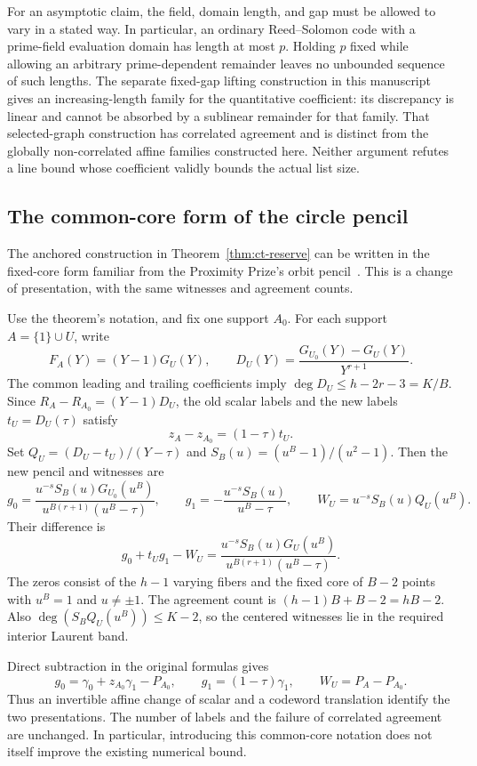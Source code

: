 \documentclass[11pt,letterpaper]{article}
\theoremstyle{definition}
\theoremstyle{remark}
\begin{document}
For an asymptotic claim, the field, domain length, and gap must be allowed
to vary in a stated way. In particular, an ordinary Reed--Solomon code
with a prime-field evaluation domain has length at most $p$. Holding
$p$ fixed while allowing an arbitrary prime-dependent remainder leaves
no unbounded sequence of such lengths. The separate fixed-gap lifting
construction in this manuscript gives an increasing-length family for
the quantitative coefficient: its discrepancy is linear and cannot be
absorbed by a sublinear remainder for that family. That selected-graph
construction has correlated agreement and is distinct from the globally
non-correlated affine families constructed here. Neither argument
refutes a line bound whose coefficient validly bounds the actual list
size.

\subsection{The common-core form of the circle pencil}
\label{app:common-core}

The anchored construction in Theorem~\ref{thm:ct-reserve} can be written
in the fixed-core form familiar from the Proximity Prize's orbit
pencil~\cite{orbit-pencil}. This is a change of presentation, with the
same witnesses and agreement counts.

Use the theorem's notation, and fix one support $A_0$. For each support
$A=\{1\}\cup U$, write
\[
 F_A(Y)=(Y-1)G_U(Y),\qquad
 D_U(Y)=\frac{G_{U_0}(Y)-G_U(Y)}{Y^{r+1}}.
\]
The common leading and trailing coefficients imply
$\deg D_U\le h-2r-3=K/B$. Since
$R_A-R_{A_0}=(Y-1)D_U$, the old scalar labels and the new labels
$t_U=D_U(\tau)$ satisfy
\[
 z_A-z_{A_0}=(1-\tau)t_U.
\]
Set $Q_U=(D_U-t_U)/(Y-\tau)$ and
$S_B(u)=(u^B-1)/(u^2-1)$. Then the new pencil and witnesses are
\[
 g_0=\frac{u^{-s}S_B(u)G_{U_0}(u^B)}
              {u^{B(r+1)}(u^B-\tau)},\qquad
 g_1=-\frac{u^{-s}S_B(u)}{u^B-\tau},\qquad
 W_U=u^{-s}S_B(u)Q_U(u^B).
\]
Their difference is
\[
 g_0+t_Ug_1-W_U
   =\frac{u^{-s}S_B(u)G_U(u^B)}
                {u^{B(r+1)}(u^B-\tau)}.
\]
The zeros consist of the $h-1$ varying fibers and the fixed core of
$B-2$ points with $u^B=1$ and $u\ne\pm1$. The agreement count is
$(h-1)B+B-2=hB-2$. Also
$\deg(S_B Q_U(u^B))\le K-2$, so the centered witnesses lie in
the required interior Laurent band.

Direct subtraction in the original formulas gives
\[
 g_0=\gamma_0+z_{A_0}\gamma_1-P_{A_0},\qquad
 g_1=(1-\tau)\gamma_1,\qquad W_U=P_A-P_{A_0}.
\]
Thus an invertible affine change of scalar and a codeword translation
identify the two presentations. The number of labels and the failure
of correlated agreement are unchanged. In particular, introducing this
common-core notation does not itself improve the existing numerical bound.
\end{document}
